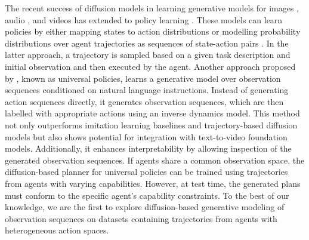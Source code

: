 The recent success of diffusion models in learning generative models for images \cite{ldm,imagen}, audio \cite{audio_diffusion}, and videos \cite{imagen_video} has extended to policy learning \cite{diffuser,diffusion_policy,3d_diffusion_policy,universal_policies,seer}. These models can learn policies by either mapping states to action distributions \cite{diffusion_policy,3d_diffusion_policy} or modelling probability distributions over agent trajectories as sequences of state-action pairs \cite{diffuser}. In the latter approach, a trajectory is sampled based on a given task description and initial observation and then executed by the agent. Another approach proposed by \citet{universal_policies}, known as universal policies, learns a generative model over observation sequences conditioned on natural language instructions. Instead of generating action sequences directly, it generates observation sequences, which are then labelled with appropriate actions using an inverse dynamics model. This method not only outperforms imitation learning baselines \cite{rt1} and trajectory-based diffusion models \cite{diffuser} but also shows potential for integration with text-to-video foundation models. Additionally, it enhances interpretability by allowing inspection of the generated observation sequences. If agents share a common observation space, the diffusion-based planner for universal policies can be trained using trajectories from agents with varying capabilities. However, at test time, the generated plans must conform to the specific agent’s capability constraints. To the best of our knowledge, we are the first to explore diffusion-based generative modeling of observation sequences on datasets containing trajectories from agents with heterogeneous action spaces.
